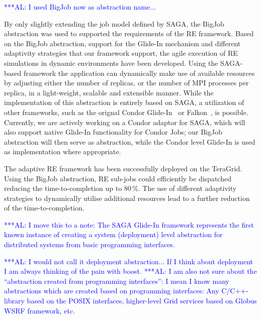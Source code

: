 \documentclass{rspublic}
\newcommand{\alnote}[1]{ {\textcolor{blue} { ***AL: #1 }}}
\newcommand{\alnote}[1]{}
\newcommand{\glidein}[1]{Glide-In }
\begin{document}
                 
\alnote{I used BigJob now as abstraction name...}  

By only slightly extending the job model defined by SAGA, the BigJob
abstraction was used to supported the requirements of the RE
framework.
Based on the BigJob abstraction, support for the Glide-In mechanism
and different adaptivity strategies that our framework support, the
agile execution of RE simulations in dynamic environments have been
developed. Using the SAGA-based framework the application can
dynamically make use of available resources by adjusting either the
number of replicas, or the number of MPI processes per replica, in a
light-weight, scalable and extensible manner.
While the implementation of this abstraction is entirely based on
SAGA, a utilization of other frameworks, such as the orignal Condor
Glide-In~\citep{citeulike:291860} or Falkon~\citep{1362680}, is
possible. Currently, we are actively working on a Condor adaptor for
SAGA, which will also support native Glide-In functionality for Condor
Jobs; our BigJob abstraction will then serve as abstraction, while the
Condor level Glide-In is used as implementation where appropriate.

The adaptive RE framework has been successfully deployed on
the TeraGrid. 
Using the BigJob abstraction, RE sub-jobs could efficiently be dispatched 
reducing the time-to-completion up to 80\,\%. The use of different 
adaptivity strategies to dynamically utilise additional resources lead 
to a further reduction of the time-to-completion.




\alnote{I move this to a note:
The SAGA \glidein\ framework represents the first known instance of creating a
system (deployment) level abstraction for distributed systems from
basic programming interfaces.} 

\alnote{I would not call it deployment abstraction... If I think about
deployment I am always thinking of the pain with boost.}
\alnote{I am also not sure about the ``abstraction created from 
  programming interfaces'': 
  I mean I know many abstractions which are created based on
  programming interfaces: Any C/C++-library based on the POSIX
  interfaces, higher-level Grid services based on Globus WSRF
  framework, etc.}   
\end{document}
